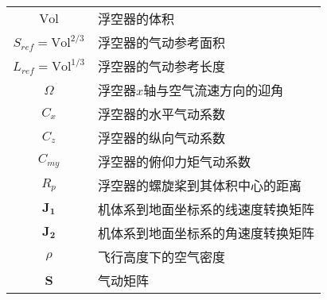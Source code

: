 \begin{longtable}{cl}
$\mathrm{Vol}$ & 浮空器的体积 \\
$S_{ref}=\mathrm{Vol}^{2/3}$ & 浮空器的气动参考面积 \\
$L_{ref}=\mathrm{Vol}^{1/3}$ & 浮空器的气动参考长度 \\
$\Omega$  & 浮空器$x$轴与空气流速方向的迎角 \\
$C_x$ & 浮空器的水平气动系数 \\
$C_z$ & 浮空器的纵向气动系数 \\
$C_{my}$ & 浮空器的俯仰力矩气动系数 \\
$R_p$ & 浮空器的螺旋桨到其体积中心的距离 \\
$\mathbf{J_1}$ & 机体系到地面坐标系的线速度转换矩阵 \\
$\mathbf{J_2}$ & 机体系到地面坐标系的角速度转换矩阵 \\
$\rho$ & 飞行高度下的空气密度 \\
$\mathbf{S}$ & 气动矩阵 \\
\end{longtable}
